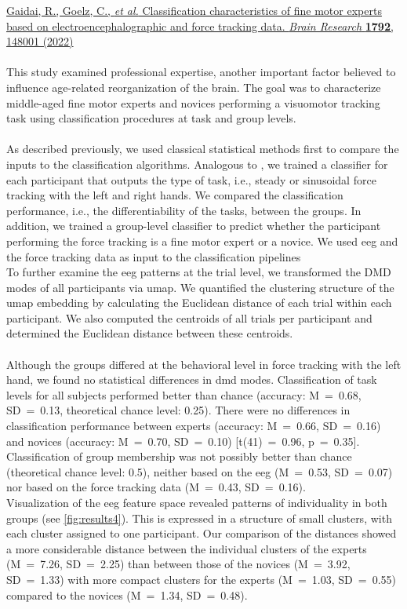 \hyperref[pub:paperIV]{Gaidai, R., Goelz, C., \textit{et al.} Classification characteristics of fine motor experts based on electroencephalographic and force tracking data. \textit{Brain Research} \textbf{1792}, 148001 (2022)}\\
\\
This study examined professional expertise, another important factor believed to influence age-related reorganization of the brain. The goal was to characterize middle-aged fine motor experts and novices performing a visuomotor tracking task using classification procedures at task and group levels.\\
\\
As described previously, we used classical statistical methods first to compare the inputs to the classification algorithms. Analogous to , we trained a classifier for each participant that outputs the type of task, i.e., steady or sinusoidal force tracking with the left and right hands. We compared the classification performance, i.e., the differentiability of the tasks, between the groups. In addition, we trained a group-level classifier to predict whether the participant performing the force tracking is a fine motor expert or a novice. We used \gls{eeg} and the force tracking data as input to the classification pipelines\\
To further examine the \gls{eeg} patterns at the trial level, we transformed the DMD modes of all participants via \gls{umap}. We quantified the clustering structure of the \gls{umap} embedding by calculating the Euclidean distance of each trial within each participant. We also computed the centroids of all trials per participant and determined the Euclidean distance between these centroids.\\
\\
Although the groups differed at the behavioral level in force tracking with the left hand, we found no statistical differences in \gls{dmd} modes. Classification of task levels for all subjects performed better than chance (accuracy: M~=~0.68, SD~=~0.13, theoretical chance level: 0.25). There were no differences in classification performance between experts (accuracy: M~=~0.66, SD~=~0.16) and novices (accuracy: M~=~0.70, SD~=~0.10) [t(41)~=~0.96, p~=~0.35].\\
Classification of group membership was not possibly better than chance (theoretical chance level: 0.5), neither based on the \gls{eeg} (M~=~0.53, SD~=~0.07) nor based on the force tracking data (M~=~0.43, SD~=~0.16).\\
Visualization of the \gls{eeg} feature space revealed patterns of individuality in both groups (see \autoref{fig:results4}). This is expressed in a structure of small clusters, with each cluster assigned to one participant. Our comparison of the distances showed a more considerable distance between the individual clusters of the experts (M~=~7.26, SD~=~2.25) than between those of the novices (M~=~3.92, SD~=~1.33) with more compact clusters for the experts (M~=~1.03, SD~=~0.55) compared to the novices (M~=~1.34, SD~=~0.48).\\

